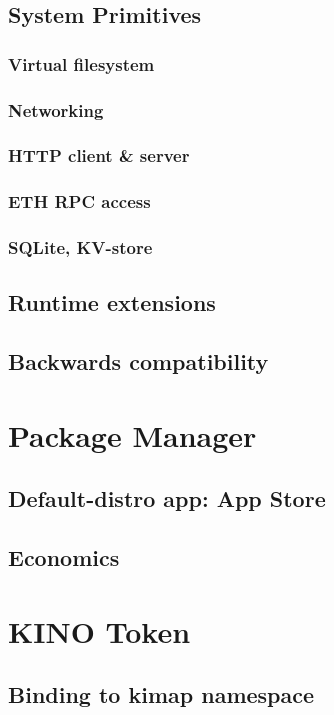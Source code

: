 \documentclass[runningheads]{llncs}
\begin{document}
\subsection{System Primitives}
\subsubsection{Virtual filesystem}
\subsubsection{Networking}
\subsubsection{HTTP client \& server}
\subsubsection{ETH RPC access}
\subsubsection{SQLite, KV-store}
\subsection{Runtime extensions}
\subsection{Backwards compatibility}



\section{Package Manager}
\subsection{Default-distro app: App Store}
\subsection{Economics}



\section{KINO Token}
\subsection{Binding to kimap namespace}
\end{document}
